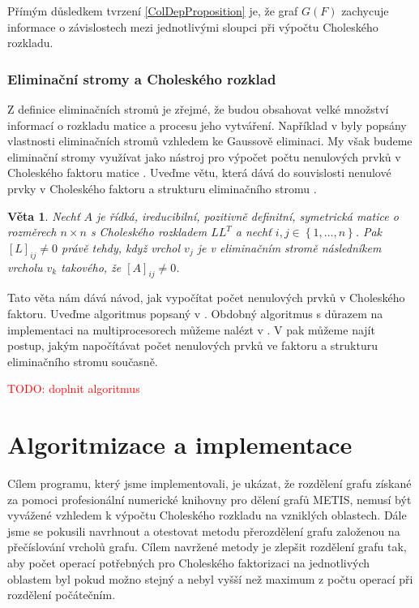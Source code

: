 \documentclass[11pt,american,czech,oneside]{book}
\theoremstyle{plain}
\newtheorem{theorem}{Věta}
\theoremstyle{definition}
\newcommand{\TODO}[1]{\textcolor{red}{TODO: #1}}
\begin{document}
Přímým důsledkem tvrzení \ref{ColDepProposition} je, že graf $G(F)$ zachycuje informace o závislostech mezi jednotlivými sloupci při výpočtu Choleského rozkladu. 

\subsection{Eliminační stromy a Choleského rozklad}
Z definice eliminačních stromů je zřejmé, že budou obsahovat velké množství informací o rozkladu matice a procesu jeho vytváření. Například v \cite{schr:82} byly popsány vlastnosti eliminačních stromů vzhledem ke Gaussově eliminaci. My však budeme eliminační stromy využívat jako nástroj pro výpočet počtu nenulových prvků v Choleského faktoru matice \cite{liu:90}. Uveďme větu, která dává do souvislosti nenulové prvky v Choleského faktoru a strukturu eliminačního stromu \cite{liu:86}.

\begin{theorem}
  Nechť $A$ je řídká, ireducibilní, pozitivně definitní, symetrická matice o rozměrech $n \times n$ s Choleského rozkladem $LL^T$ a nechť $i,j \in \left\{1,\ldots,n \right\}$. Pak $[L]_{ij} \neq 0$ právě tehdy, když vrchol $v_j$ je v eliminačním stromě následníkem vrcholu $v_k$ takového, že $[A]_{ij} \neq 0$.
\end{theorem}

Tato věta nám dává návod, jak vypočítat počet nenulových prvků v Choleského faktoru. Uveďme algoritmus popsaný v \cite{liu:90}. Obdobný algoritmus s důrazem na implementaci na multiprocesorech můžeme nalézt v \cite{zmgi:88}. V \cite{basm:87} pak můžeme najít postup, jakým napočítávat počet nenulových prvků ve faktoru a strukturu eliminačního stromu současně.

\TODO{doplnit algoritmus}


\chapter{Algoritmizace a implementace}

Cílem programu, který jsme implementovali, je ukázat, že rozdělení grafu získané za pomoci profesionální numerické knihovny pro dělení grafů METIS, nemusí být vyvážené vzhledem k výpočtu Choleského rozkladu na vzniklých oblastech. Dále jsme se pokusili navrhnout a otestovat metodu přerozdělení grafu založenou na přečíslování vrcholů grafu. Cílem navržené metody je zlepšit rozdělení grafu tak, aby počet operací potřebných pro Choleského faktorizaci na jednotlivých oblastem byl pokud možno stejný a nebyl vyšší než maximum z počtu operací při rozdělení počátečním.
\end{document}
